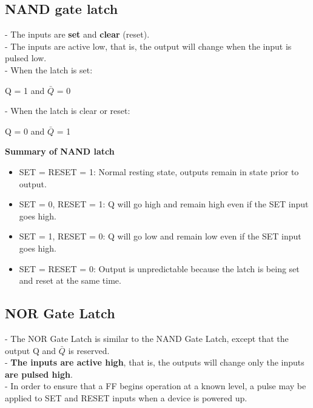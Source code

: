 \documentclass[12pt]{article}
\begin{document}
\subsection{NAND gate latch}
- The inputs are \textbf{set} and \textbf{clear} (reset). \\
- The inputs are active low, that is, the output will change when the input is pulsed low. \\
- When the latch is set: 
\begin{center}
Q = 1 and $\bar{Q}$ = 0
\end{center}
- When the latch is clear or reset: 
\begin{center}
Q = 0 and $\bar{Q}$ = 1
\end{center}
\textbf{Summary of NAND latch} \\
\begin{itemize}
	\item SET = RESET = 1: Normal resting state, outputs remain in state prior to output.
	\item  SET = 0, RESET = 1: Q will go high and remain high even if the SET input goes high.
	\item SET = 1, RESET = 0: Q will go low and remain low even if the SET input goes high. 
	\item SET = RESET = 0: Output is unpredictable because the latch is being set and reset at the same time.
\end{itemize}
\subsection{NOR Gate Latch}
- The NOR Gate Latch is similar to the NAND Gate Latch, except that the output Q and $\bar{Q}$ is reserved. \\
- \textbf{The inputs are active high}, that is, the outputs will change only the inputs \textbf{are pulsed high}. \\
- In order to ensure that a FF begins operation at a known level, a pulse may be applied to SET and RESET inputs when a device is powered up.
\end{document}
